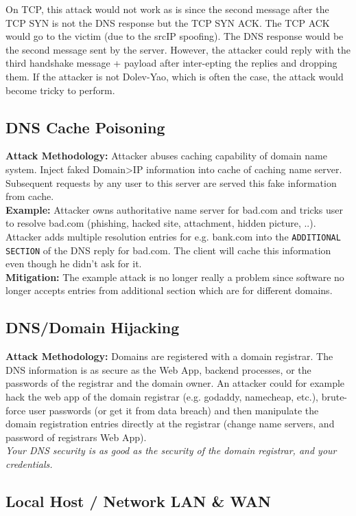 \documentclass[11pt,oneside,a4paper]{article}
\begin{document}
On TCP, this attack would not work as is since the second message after the TCP SYN is not the DNS response but the TCP SYN ACK. The TCP ACK would go to the victim (due to the srcIP spoofing). The DNS response would be the second message sent by the server. However, the attacker could reply with the third handshake message + payload after inter-epting the replies and dropping them. If the attacker is not Dolev-Yao, which is often the case, the attack would become tricky to perform.

\subsection{DNS Cache Poisoning}

\textbf{Attack Methodology:} Attacker abuses caching capability of domain name system. Inject faked Domain\textgreater IP information into cache of caching name server. Subsequent requests by any user to this server are served this fake information from cache.\\
\textbf{Example:} Attacker owns authoritative name server for bad.com and tricks user to resolve bad.com (phishing, hacked site, attachment, hidden picture, ..). Attacker adds multiple resolution entries for e.g. bank.com into the \texttt{ADDITIONAL SECTION} of the DNS reply  for bad.com. The client will cache this information even though he didn't ask for it.\\
\textbf{Mitigation:} The example attack is no longer really a problem since software no longer accepts entries from additional section which are for different domains.

\subsection{DNS/Domain Hijacking}

\textbf{Attack Methodology:} Domains are registered with a domain registrar. The DNS information is as secure as the Web App, backend processes, or the passwords of the registrar and the domain owner. An attacker could for example hack the web app of the domain registrar (e.g. godaddy, namecheap, etc.), brute-force user passwords (or get it from data breach) and then manipulate the domain registration entries directly at the registrar (change name servers, and password of registrars Web App).\\
\textit{Your DNS security is as good as the security of the domain registrar, and your credentials.}

\subsection{Local Host / Network LAN \& WAN}
\end{document}
